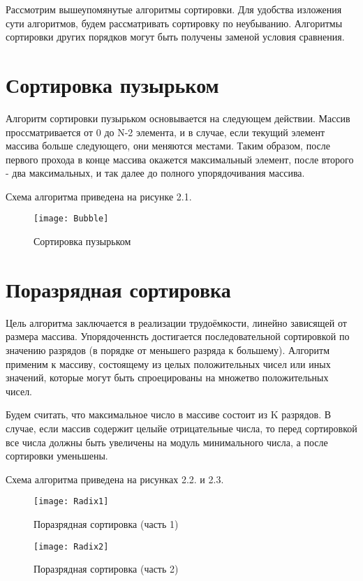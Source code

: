 Рассмотрим вышеупомянутые алгоритмы сортировки. Для удобства изложения сути алгоритмов, будем рассматривать сортировку по неубыванию. Алгоритмы сортировки других порядков могут быть получены заменой условия сравнения.

\section{Сортировка пузырьком}
Алгоритм сортировки пузырьком основывается на следующем действии. Массив проссматривается от 0 до N-2 элемента, и в случае, если текущий элемент массива больше следующего, они меняются местами. Таким образом, после первого прохода в конце массива окажется максимальный элемент, после второго - два максимальных, и так далее до полного упорядочивания массива.

Схема алгоритма приведена на рисунке 2.1.
\begin{figure}[h]
	\begin{center}
		{\texttt{[image: Bubble]}}
		\caption{Сортировка пузырьком}
	\end{center}
\end{figure}


\section{Поразрядная сортировка}
Цель алгоритма заключается в реализации трудоёмкости, линейно зависящей от размера массива. Упорядоченнсть достигается последовательной сортировкой по значению разрядов (в порядке от меньшего разряда к большему). Алгоритм применим к массиву, состоящему из целых положительных чисел или иных значений, которые могут быть спроецированы на множетво положительных чисел. 

Будем считать, что максимальное число в массиве состоит из K разрядов. В случае, если массив содержит целыйе отрицательные числа, то перед сортировкой все числа должны быть увеличены на модуль минимального числа, а после сортировки уменьшены.

Схема алгоритма приведена на рисунках 2.2. и 2.3.
\begin{figure}[h]
	\begin{center}
		{\texttt{[image: Radix1]}}
		\caption{Поразрядная сортировка (часть 1)}
	\end{center}
\end{figure}

\begin{figure}[h]
	\begin{center}
		{\texttt{[image: Radix2]}}
		\caption{Поразрядная сортировка (часть 2)}
	\end{center}
\end{figure}


